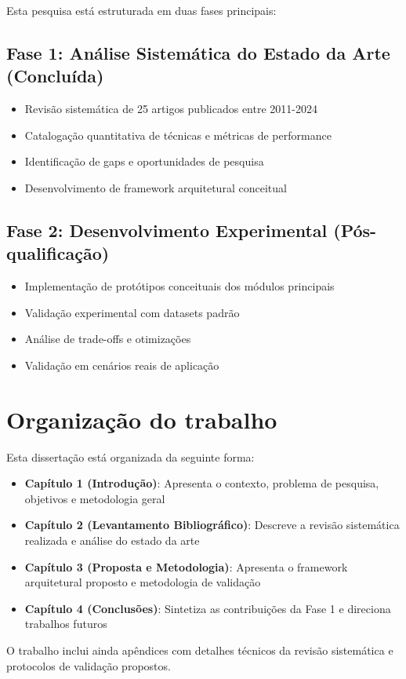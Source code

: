 Esta pesquisa está estruturada em duas fases principais:

\subsection{Fase 1: Análise Sistemática do Estado da Arte (Concluída)}
\begin{itemize}
    \item Revisão sistemática de 25 artigos publicados entre 2011-2024
    \item Catalogação quantitativa de técnicas e métricas de performance
    \item Identificação de gaps e oportunidades de pesquisa
    \item Desenvolvimento de framework arquitetural conceitual
\end{itemize}

\subsection{Fase 2: Desenvolvimento Experimental (Pós-qualificação)}
\begin{itemize}
    \item Implementação de protótipos conceituais dos módulos principais
    \item Validação experimental com datasets padrão
    \item Análise de trade-offs e otimizações
    \item Validação em cenários reais de aplicação
\end{itemize}

\section{Organização do trabalho}\label{sec:organizacao}

Esta dissertação está organizada da seguinte forma:

\begin{itemize}
    \item \textbf{Capítulo 1 (Introdução)}: Apresenta o contexto, problema de pesquisa, objetivos e metodologia geral
    \item \textbf{Capítulo 2 (Levantamento Bibliográfico)}: Descreve a revisão sistemática realizada e análise do estado da arte
    \item \textbf{Capítulo 3 (Proposta e Metodologia)}: Apresenta o framework arquitetural proposto e metodologia de validação
    \item \textbf{Capítulo 4 (Conclusões)}: Sintetiza as contribuições da Fase 1 e direciona trabalhos futuros
\end{itemize}

O trabalho inclui ainda apêndices com detalhes técnicos da revisão sistemática e protocolos de validação propostos.